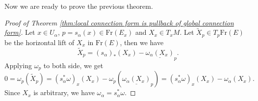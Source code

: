 Now we are ready to prove the previous theorem.
\begin{proof}[Proof of Theorem \ref{thm:local connection form is pullback of global connection form}]
    Let $x\in U_\alpha$, $p=s_\alpha(x)\in \mathrm{Fr}(E_x)$ and $X_x\in T_xM$. 
    Let $\tilde{X}_p\in T_p\mathrm{Fr}(E)$ be the horizontal lift of $X_x$ in $\mathrm{Fr}(E)$, then we have
    \begin{equation*}
        \tilde{X}_p = (s_\alpha)_*(X_x) - \underline{\omega_\alpha(X_x)}_p.
    \end{equation*}
    Applying $\omega_p$ to both side, we get 
    \begin{equation*}
        0 = \omega_p(\tilde{X}_p) = (s_\alpha^*\omega)_x(X_x) - \omega_p(\underline{\omega_\alpha(X_x)}_p) 
        = (s_\alpha^*\omega)_x(X_x) - \omega_\alpha(X_x).
    \end{equation*}
    Since $X_x$ is arbitrary, we have $\omega_\alpha = s_\alpha^*\omega$.
\end{proof}

